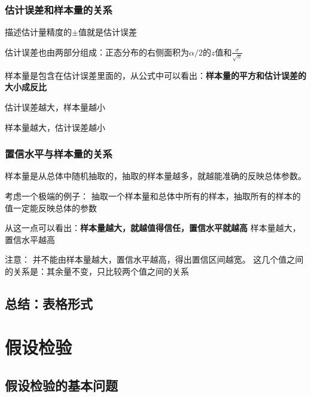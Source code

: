 \documentclass[UTF8,10pt]{book}
\begin{document}
        	\subsection{估计误差和样本量的关系}
        		描述估计量精度的\(\pm\)值就是估计误差
        		
        		估计误差也由两部分组成：正态分布的右侧面积为\(\alpha / 2 \)的\(z\)值和\(\frac{\sigma}{\sqrt{n}}\)
        		
        		样本量是包含在估计误差里面的，从公式中可以看出：\textbf{样本量的平方和估计误差的大小成反比}
        		
        		{\kaishu
        		估计误差越大，样本量越小
        		
        		样本量越大，估计误差越小}
        	
        	\subsection{置信水平与样本量的关系}
        		样本量是从总体中随机抽取的，抽取的样本量越多，就越能准确的反映总体参数。
        		
        		考虑一个极端的例子：
        		抽取一个样本量和总体中所有的样本，抽取所有的样本的值一定能反映总体的参数 
        		
        		从这一点可以看出：\textbf{样本量越大，就越值得信任，置信水平就越高}
        		样本量越大，置信水平越高
        		
        		
        		
        		注意：{\kaishu 
        		并不能由样本量越大，置信水平越高，得出置信区间越宽。
        		这几个值之间的关系是：其余量不变，只比较两个值之间的关系}

        \section{总结：表格形式}


\clearpage
\chapter{假设检验}

    \section{假设检验的基本问题}
\end{document}
